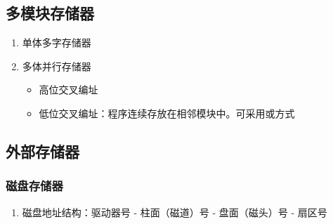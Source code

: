 \documentclass[a4paper,12pt]{article}
\begin{document}
    \subsection{多模块存储器}

    \begin{enumerate}
        \item 单体多字存储器
        \item 多体并行存储器
        \begin{itemize}
            \item 高位交叉编址
            \item 低位交叉编址：程序连续存放在相邻模块中。可采用{\color{customgreen}{轮流启动}}或{\color{customgreen}{同时启动}}方式
        \end{itemize}
    \end{enumerate}

    \subsection{外部存储器}

    \subsubsection{磁盘存储器}

    \begin{enumerate}
        \item 磁盘地址结构：驱动器号 - 柱面（磁道）号 - 盘面（磁头）号 - 扇区号
    \end{enumerate}
\end{document}
